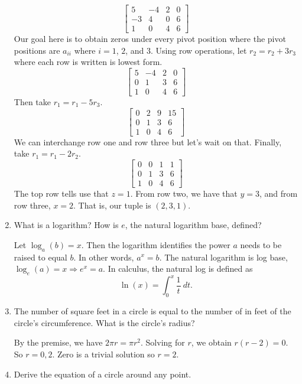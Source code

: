 \begin{enumerate}
  \[
  \begin{bmatrix}
    5 & -4 & 2 & 0\\
    -3 & 4 & 0 & 6\\
    1 & 0 & 4 & 6
  \end{bmatrix}
  \]
  Our goal here is to obtain zeros under every pivot position where the pivot
  positions are \(a_{ii}\) where \(i = 1\), \(2\), and \(3\).
  Using row operations, let \(r_2 = r_2 + 3r_3\) where each row is written is
  lowest form.
  \[
  \begin{bmatrix}
    5 & -4 & 2 & 0\\
    0 & 1 & 3 & 6\\
    1 & 0 & 4 & 6
  \end{bmatrix}
  \]
  Then take \(r_1 = r_1 - 5r_3\).
  \[
  \begin{bmatrix}
    0 & 2 & 9 & 15\\
    0 & 1 & 3 & 6\\
    1 & 0 & 4 & 6
  \end{bmatrix}
  \]
  We can interchange row one and row three but let's wait on that.
  Finally, take \(r_1 = r_1 - 2r_2\).
  \[
  \begin{bmatrix}
    0 & 0 & 1 & 1\\
    0 & 1 & 3 & 6\\
    1 & 0 & 4 & 6
  \end{bmatrix}
  \]
  The top row tells use that \(z = 1\).
  From row two, we have that \(y = 3\), and from row three, \(x = 2\).
  That is, our tuple is \((2, 3, 1)\).
\item
  What is a logarithm?
  How is \(e\), the natural logarithm base, defined?
  \par\smallskip
  Let \(\log_a(b) = x\).
  Then the logarithm identifies the power \(a\) needs to be raised to equal
  \(b\).
  In other words, \(a^x = b\).
  The natural logarithm is log base, \(\log_e(a) = x\Rightarrow e^x = a\).
  In calculus, the natural log is defined as
  \[
  \ln(x) = \int_0^x\frac{1}{t} \ dt.
  \]
\item
  The number of square feet in a circle is equal to the number of in feet of
  the circle's circumference.
  What is the circle's radius?
  \par\smallskip
  By the premise, we have \(2\pi r = \pi r^2\).
  Solving for \(r\), we obtain \(r(r - 2) = 0\).
  So \(r = 0, 2\).
  Zero is a trivial solution so \(r = 2\).
\item
  \label{circ}
  Derive the equation of a circle around any point.
  \par\smallskip

\end{enumerate}
